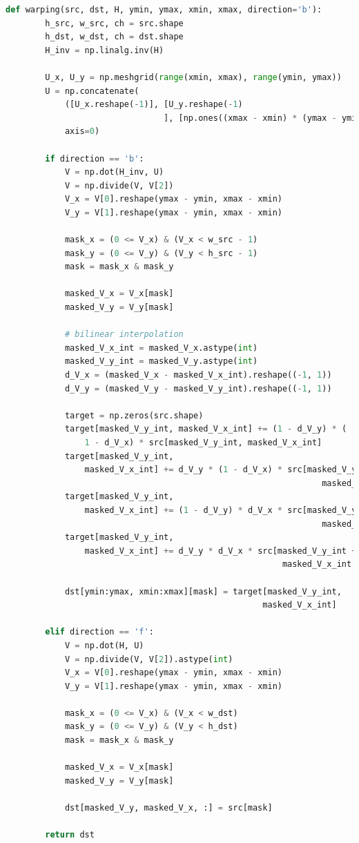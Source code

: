 \documentclass[a4paper, 12pt]{article}
\begin{document}
\begin{lstlisting}[language=python]
    def warping(src, dst, H, ymin, ymax, xmin, xmax, direction='b'):
        h_src, w_src, ch = src.shape
        h_dst, w_dst, ch = dst.shape
        H_inv = np.linalg.inv(H)

        U_x, U_y = np.meshgrid(range(xmin, xmax), range(ymin, ymax))
        U = np.concatenate(
            ([U_x.reshape(-1)], [U_y.reshape(-1)
                                ], [np.ones((xmax - xmin) * (ymax - ymin))]),
            axis=0)

        if direction == 'b':
            V = np.dot(H_inv, U)
            V = np.divide(V, V[2])
            V_x = V[0].reshape(ymax - ymin, xmax - xmin)
            V_y = V[1].reshape(ymax - ymin, xmax - xmin)

            mask_x = (0 <= V_x) & (V_x < w_src - 1)
            mask_y = (0 <= V_y) & (V_y < h_src - 1)
            mask = mask_x & mask_y

            masked_V_x = V_x[mask]
            masked_V_y = V_y[mask]

            # bilinear interpolation
            masked_V_x_int = masked_V_x.astype(int)
            masked_V_y_int = masked_V_y.astype(int)
            d_V_x = (masked_V_x - masked_V_x_int).reshape((-1, 1))
            d_V_y = (masked_V_y - masked_V_y_int).reshape((-1, 1))
            
            target = np.zeros(src.shape)
            target[masked_V_y_int, masked_V_x_int] += (1 - d_V_y) * (
                1 - d_V_x) * src[masked_V_y_int, masked_V_x_int]
            target[masked_V_y_int,
                masked_V_x_int] += d_V_y * (1 - d_V_x) * src[masked_V_y_int + 1,
                                                                masked_V_x_int]
            target[masked_V_y_int,
                masked_V_x_int] += (1 - d_V_y) * d_V_x * src[masked_V_y_int,
                                                                masked_V_x_int + 1]
            target[masked_V_y_int,
                masked_V_x_int] += d_V_y * d_V_x * src[masked_V_y_int + 1,
                                                        masked_V_x_int + 1]

            dst[ymin:ymax, xmin:xmax][mask] = target[masked_V_y_int,
                                                    masked_V_x_int]

        elif direction == 'f':
            V = np.dot(H, U)
            V = np.divide(V, V[2]).astype(int)
            V_x = V[0].reshape(ymax - ymin, xmax - xmin)
            V_y = V[1].reshape(ymax - ymin, xmax - xmin)

            mask_x = (0 <= V_x) & (V_x < w_dst)
            mask_y = (0 <= V_y) & (V_y < h_dst)
            mask = mask_x & mask_y

            masked_V_x = V_x[mask]
            masked_V_y = V_y[mask]

            dst[masked_V_y, masked_V_x, :] = src[mask]

        return dst
\end{lstlisting}
\end{document}
